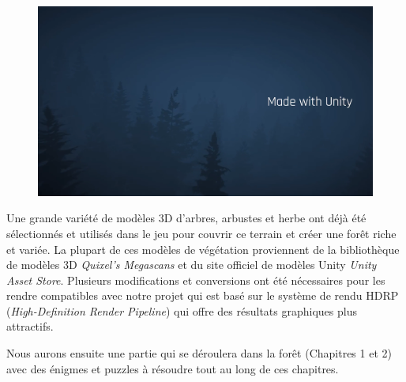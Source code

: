 \begin{figure}[H]
\centering
\begin{minipage}{.5\textwidth}
  \centering
  \centerline{\includegraphics[width=1\linewidth]{img/cine.png}}
  \label{fig:cinematique}
\end{minipage}%
\end{figure}

Une grande variété de modèles 3D d’arbres, arbustes et herbe ont déjà été sélectionnés et utilisés dans le jeu pour couvrir ce terrain et créer une forêt riche et variée. La plupart de ces modèles de végétation proviennent de la bibliothèque de modèles 3D \emph{Quixel’s Megascans} et du site officiel de modèles Unity \emph{Unity Asset Store}. Plusieurs modifications et conversions ont été nécessaires pour les rendre compatibles avec notre projet qui est basé sur le système de rendu HDRP (\emph{High-Definition Render Pipeline}) qui offre des résultats graphiques plus attractifs.
\newline

Nous aurons ensuite une partie qui se déroulera dans la forêt (Chapitres 1 et 2) avec des énigmes et puzzles à résoudre tout au long de ces chapitres.

